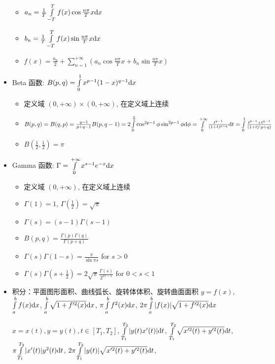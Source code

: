 \documentclass[landscape, twocolumn, 8pt, a4paper, twoside]{extarticle}
\begin{document}
\begin{itemize}
\begin{itemize}
  \item $a_n = \frac{1}{T} \int\limits_{-T}^{T} f(x) \cos \frac{n\pi}{T} x {\rm d}x$
  \item $b_n = \frac{1}{T} \int\limits_{-T}^{T} f(x) \sin \frac{n\pi}{T} x {\rm d}x$
  \item $f(x) = \frac{a_0}{2} +
    \sum\limits_{n = 1}^{+\infty}(a_n \cos \frac{n\pi}{T} x + b_n \sin \frac{n\pi}{T}x)$
  \end{itemize}
\item Beta 函数: $B(p, q) = \int\limits_{0}^{1} x^{p - 1} (1 - x) ^ {q - 1} {\rm d}x$
  \begin{itemize}
  \item 定义域 $(0, +\infty) \times (0, +\infty)$, 在定义域上连续
  \item $B(p, q) = B(q, p) = \frac{q - 1}{p + q - 1} B(p, q - 1)
    = 2\int\limits_{0}^{\frac{\pi}{2}} \cos^{2p - 1}\phi \sin^{2p - 1} \phi {\rm d}\phi
    = \int\limits_{0}^{+\infty} \frac{t^{q - 1}}{(1 + t)^{p + q}} {\rm d}t
    = \int\limits_{0}^{1} \frac{t^{p - 1} + t ^ {q - 1}}{(1 + t) ^ (p + q)}$
  \item $B(\frac{1}{2}, \frac{1}{2}) = \pi$
  \end{itemize}
\item Gamma 函数: $\Gamma = \int\limits_{0}^{+\infty} x^{s - 1} e ^ {-x} {\rm d}x$
  \begin{itemize}
  \item 定义域 $(0, +\infty)$, 在定义域上连续
  \item $\Gamma(1) = 1$, $\Gamma(\frac{1}{2}) = \sqrt{\pi}$
  \item $\Gamma(s) = (s - 1) \Gamma(s - 1)$
  \item $B(p, q) = \frac{\Gamma(p)\Gamma(q)}{\Gamma(p + q)}$
  \item $\Gamma(s)\Gamma(1 - s) = \frac{\pi}{\sin \pi s}$ for $s > 0$
  \item $\Gamma(s)\Gamma(s + \frac{1}{2}) = 2\sqrt{\pi} \frac{\Gamma(s)}{2^{2s - 1}}$ for $0 < s < 1$
  \end{itemize}
\item 积分：平面图形面积、曲线弧长、旋转体体积、旋转曲面面积
  $y = f(x)$,
  $\int\limits_{a}^{b}f(x){\rm d}x$,
  $\int\limits_{a}^{b} \sqrt{1 + f^{\prime 2}(x)} {\rm d}x$,
  $\pi\int\limits_{a}^{b} f^2(x) {\rm d}x$,
  $2\pi\int\limits_{a}^{b}|f(x)|\sqrt{1 + f^{\prime 2}(x)} {\rm d}x$

  $x = x(t), y = y(t), t \in [T_1, T_2]$,
  $\int\limits_{T_1}^{T_2} | y(t) x^\prime(t) | {\rm d}t$,
  $\int\limits_{T_1}^{T_2} \sqrt{x^{\prime 2}(t) + y^{\prime 2}(t)} {\rm d}t$,
  $\pi\int\limits_{T_1}^{T_2} |x^\prime(t)| y^2(t) {\rm d}t$,
  $2\pi\int\limits_{T_1}^{T_2}|y(t)|\sqrt{x^{\prime 2}(t) + y^{\prime 2}(t)}{\rm d}t$,


\end{itemize}
\end{document}
